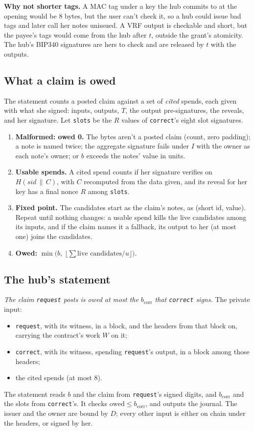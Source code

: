 \documentclass[11pt]{article}
\newcommand{\bcorr}{b_{\mathrm{corr}}}
\newcommand{\tx}[1]{\texttt{#1}}
\begin{document}
\textbf{Why not shorter tags.} A MAC tag under a key the hub commits to
at the opening would be 8 bytes, but the user can't check it, so a hub
could issue bad tags and later call her notes unissued. A VRF output is
checkable and short, but the payee's tags would come from the hub after
$t$, outside the grant's atomicity. The hub's BIP340 signatures are hers
to check and are released by $t$ with the outputs.

\subsection{What a claim is owed}

The statement counts a posted claim against a set of \emph{cited}
spends, each given with what she signed: inputs, outputs, $T$, the
output pre-signatures, the reveals, and her signature. Let \tx{slots} be
the $R$ values of \tx{correct}'s eight slot signatures.

\begin{enumerate}[nosep]
\item \textbf{Malformed: owed 0.} The bytes aren't a posted claim (count,
  zero padding); a note is named twice; the aggregate signature fails
  under $I$ with the owner as each note's owner; or $b$ exceeds the
  notes' value in units.
\item \textbf{Usable spends.} A cited spend counts if her signature
  verifies on $H(\mathit{sid} \,\|\, C)$, with $C$ recomputed from the
  data given, and its reveal for her key has a final nonce $R$ among
  \tx{slots}.
\item \textbf{Fixed point.} The candidates start as the claim's notes,
  as (short id, value). Repeat until nothing changes: a usable spend
  kills the live candidates among its inputs, and if the claim names it
  a fallback, its output to her (at most one) joins the candidates.
\item \textbf{Owed:} $\min\big(b,\ \lfloor \sum \text{live candidates} / u
  \rfloor\big)$.
\end{enumerate}

\subsection{The hub's statement}

\emph{The claim \tx{request} posts is owed at most the $\bcorr$ that
\tx{correct} signs.} The private input:
\begin{itemize}[nosep]
\item \tx{request}, with its witness, in a block, and the headers from
  that block on, carrying the contract's work $W$ on it;
\item \tx{correct}, with its witness, spending \tx{request}'s output, in
  a block among those headers;
\item the cited spends (at most 8).
\end{itemize}
The statement reads $b$ and the claim from \tx{request}'s signed
digits, and $\bcorr$ and the slots from \tx{correct}'s. It checks
$\mathrm{owed} \le \bcorr$, and outputs the journal. The issuer and the
owner are bound by $D$; every other input is either on chain under the
headers, or signed by her.
\end{document}
